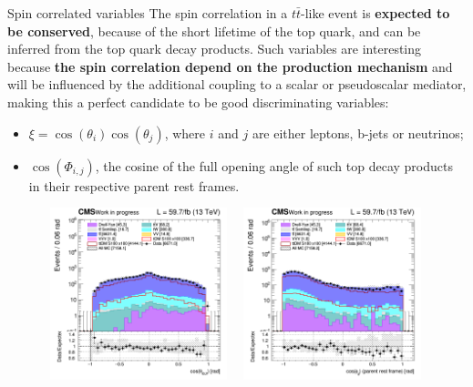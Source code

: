 \documentclass[8pt]{beamer}
\begin{document}
\begin{frame}{Spin correlated variables}
\justifying
The \alert{spin correlation} in a $t \bar t$-like event is \textbf{expected to be conserved}, because of the short lifetime of the top quark, and can be inferred from the top quark decay products. \vfill
Such variables are interesting because \textbf{the spin correlation depend on the production mechanism} and will be influenced by
the additional coupling to a scalar or pseudoscalar mediator, making this a perfect candidate to be good discriminating variables:
\begin{itemize}
\justifying
\item $\xi = \cos(\theta_i) \cos(\theta_j)$, where $i$ and $j$ are either leptons, b-jets or neutrinos;
\item $\cos(\Phi_{i,j})$, the cosine of the full opening angle of such top decay products in their respective parent rest frames.
\end{itemize} \vfill

\begin{figure}[htbp]
\centering
\begin{minipage}[b]{.49\textwidth}
\includegraphics[width=5.5cm, height=5cm]{figs/2018/SmearSR-ttDM-scalar100/log_cratio_topCR_ll_costhetall.png}
\end{minipage}\hfill
\begin{minipage}[b]{.49\textwidth}
\includegraphics[width=5.5cm, height=5cm]{figs/2018/SmearSR-ttDM-scalar100/log_cratio_topCR_ll_cosphill.png}
\end{minipage} \hfill
\label{fig:SRdiscmblt}
\end{figure}
\end{frame}
\end{document}
